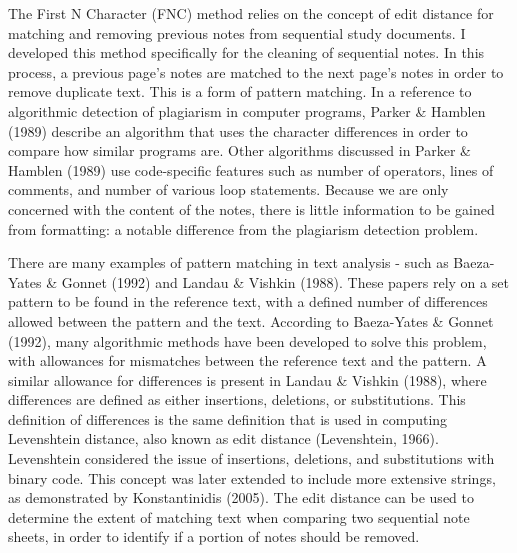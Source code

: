 \documentclass[print]{nuthesis}
\begin{document}
The First N Character (FNC) method relies on the concept of edit distance for matching and removing previous notes from sequential study documents.
I developed this method specifically for the cleaning of sequential notes.
In this process, a previous page's notes are matched to the next page's notes in order to remove duplicate text.
This is a form of pattern matching.
In a reference to algorithmic detection of plagiarism in computer programs, Parker \& Hamblen (1989) describe an algorithm that uses the character differences in order to compare how similar programs are.
Other algorithms discussed in Parker \& Hamblen (1989) use code-specific features such as number of operators, lines of comments, and number of various loop statements.
Because we are only concerned with the content of the notes, there is little information to be gained from formatting: a notable difference from the plagiarism detection problem.

There are many examples of pattern matching in text analysis - such as Baeza-Yates \& Gonnet (1992) and Landau \& Vishkin (1988).
These papers rely on a set pattern to be found in the reference text, with a defined number of differences allowed between the pattern and the text.
According to Baeza-Yates \& Gonnet (1992), many algorithmic methods have been developed to solve this problem, with allowances for mismatches between the reference text and the pattern.
A similar allowance for differences is present in Landau \& Vishkin (1988), where differences are defined as either insertions, deletions, or substitutions.
This definition of differences is the same definition that is used in computing Levenshtein distance, also known as edit distance (Levenshtein, 1966).
Levenshtein considered the issue of insertions, deletions, and substitutions with binary code.
This concept was later extended to include more extensive strings, as demonstrated by Konstantinidis (2005).
The edit distance can be used to determine the extent of matching text when comparing two sequential note sheets, in order to identify if a portion of notes should be removed.
\end{document}
